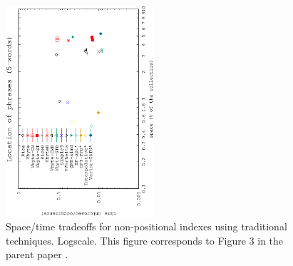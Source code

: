 \documentclass[review]{elsarticle}
\begin{document}
\begin{figure}[t]
\begin{center}
\includegraphics[angle=-90,width=0.49\textwidth]{../figures/f1/phrases5-5/nonpos-5_5.eps}
\caption{Space/time tradeoffs for non-positional indexes using traditional
techniques. Logscale. This figure corresponds to Figure 3 in the parent paper \cite{CFMNis16.3}.}
\label{fig:nonpos}
\end{center}
\end{figure}
\end{document}
